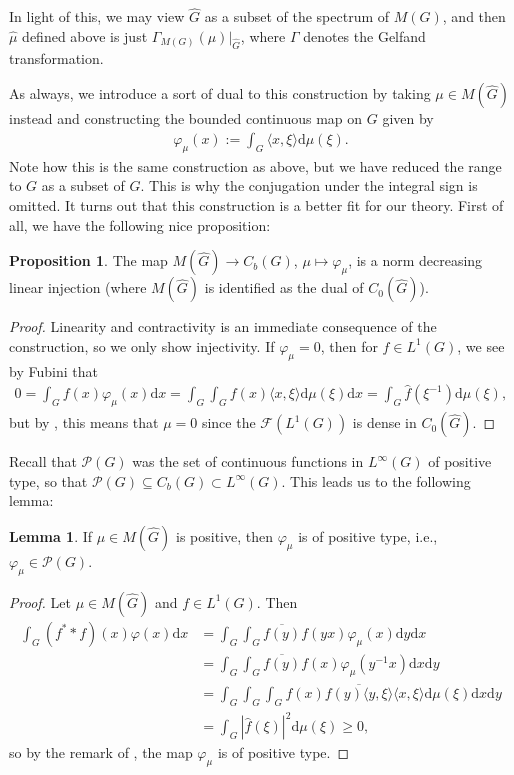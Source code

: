 \documentclass[10pt,twoside,openany,final]{memoir}
\theoremstyle{definition}
\newtheorem{lemma}[theorem]{Lemma}
\newtheorem{proposition}[theorem]{Proposition}
\theoremstyle{Break}
\newcommand{\F}{\mathcal{F}}
\newcommand{\G}{\widehat{G}}
\renewcommand{\P}{\mathcal{P}}
\renewcommand{\d}{\mathrm{d}}
\begin{document}
In light of this, we may view $\G$ as a subset of the spectrum of $M(G)$, and then $\widehat{\mu}$ defined above is just $\Gamma_{M(G)}(\mu)\big|_{\G}$, where $\Gamma$ denotes the Gelfand transformation.

As always, we introduce a sort of dual to this construction by taking $\mu \in M(\G)$ instead and constructing the bounded continuous map on $G$ given by
\begin{align*}
	\varphi_\mu(x):=\int_G \langle x,\xi \rangle \d \mu(\xi).
\end{align*}
Note how this is the same construction as above, but we have reduced the range to $G$ as a subset of $\G$. This is why the conjugation under the integral sign is omitted. It turns out that this construction is a better fit for our theory. First of all, we have the following nice proposition:
\begin{proposition}
	The map $M(\G)\to C_b(G)$, $\mu \mapsto \varphi_\mu$, is a norm decreasing linear injection (where $M(\G)$ is identified as the dual of $C_0(\G)$).
	\label{4.17}
\end{proposition}
\begin{proof}
	Linearity and contractivity is an immediate consequence of the construction, so we only show injectivity. If $\varphi_\mu=0$, then for $f \in L^1(G)$, we see by Fubini that
	\begin{align*}
		0 = \int_G f(x) \varphi_\mu(x) \d x = \int_G \int_G f(x) \langle x,\xi \rangle \d \mu(\xi) \d x=\int_G \widehat{f}(\xi^{-1}) \d \mu(\xi),
	\end{align*}
	but by , this means that $\mu=0$ since the $\F(L^1(G))$ is dense in $C_0(\G)$.
\end{proof}
Recall that $\P(G)$ was the set of continuous functions in $L^\infty(G)$ of positive type, so that $\P(G) \subseteq C_b(G) \subset L^\infty(G)$. This leads us to the following lemma:
\begin{lemma}
	If $\mu \in M(\G)$ is positive, then $\varphi_\mu$ is of positive type, i.e., $\varphi_\mu \in \P(G)$.
\end{lemma}
\begin{proof}
	Let $\mu \in M(\G)$ and $f \in L^1(G)$. Then
	\begin{align*}
		\int_G (f^*\ast f)(x) \varphi(x) \d x &= \int_G \int_G \overline{f(y)} f(yx) \varphi_\mu(x) \d y \d x\\
		&= \int_G \int_G \overline{f(y)} f(x) \varphi_\mu(y^{-1}x) \d x \d y\\
		&= \int_G \int_G \int_G  f(x) \overline{f(y) \langle y, \xi\rangle} \langle x, \xi\rangle \d \mu(\xi) \d x \d y\\
		&= \int_G |\widehat{f}(\xi)|^2 \d \mu(\xi) \geq 0,
	\end{align*}
	so by the remark of , the map $\varphi_\mu$ is of positive type.
\end{proof}
\end{document}
